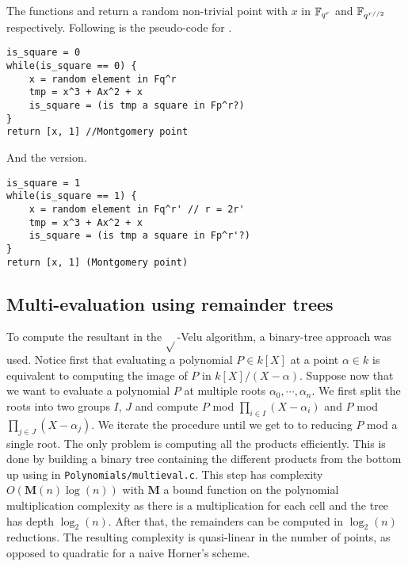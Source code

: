 \documentclass[../main.tex]{subfilesubs}
\begin{document}
The functions  and  return a random non-trivial point with $x$ in $\mathbb{F}_{q^{r}}$ and $\mathbb{F}_{q^{r//2}}$ respectively.
Following is the pseudo-code for .
\begin{verbatim}
is_square = 0
while(is_square == 0) {
	x = random element in Fq^r
	tmp = x^3 + Ax^2 + x
	is_square = (is tmp a square in Fp^r?)
}
return [x, 1] //Montgomery point
\end{verbatim}
And the  version.
\begin{verbatim}
is_square = 1
while(is_square == 1) {
	x = random element in Fq^r' // r = 2r'
	tmp = x^3 + Ax^2 + x
	is_square = (is tmp a square in Fp^r'?)
}
return [x, 1] (Montgomery point)
\end{verbatim}



\subsection{Multi-evaluation using remainder trees\label{multieval}}
To compute the resultant in the $\sqrt{}$-Velu algorithm, a binary-tree approach was used.
Notice first that evaluating a polynomial $P\in k[X]$ at a point $\alpha\in k$ is equivalent to computing the image of $P$ in $k[X]/(X-\alpha)$.
Suppose now that we want to evaluate a polynomial $P$ at multiple roots $\alpha_0, \cdots,\alpha_n$.
We first split the roots into two groups $I$, $J$ and compute $P$ mod $\prod_{i\in I} (X-\alpha_i)$ and $P$ mod $\prod_{j\in J} (X-\alpha_j)$.
We iterate the procedure until we get to to reducing $P$ mod a single root.
The only problem is computing all the products efficiently.
This is done by building a binary tree containing the different products from the bottom up using  in \texttt{Polynomials/multieval.c}.
This step has complexity $O(\mathbf{M}(n)\log(n))$ with $\mathbf{M}$ a bound function on the polynomial multiplication complexity as there is a multiplication for each cell and the tree has depth $\log_2(n)$.
After that, the remainders can be computed in $\log_2(n)$ reductions.
The resulting complexity is quasi-linear in the number of points, as opposed to quadratic for a naive Horner's scheme.
\end{document}
